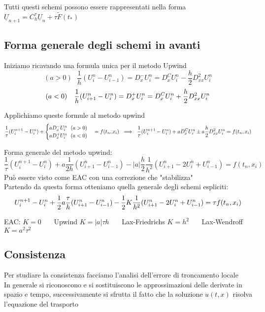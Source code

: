 \documentclass{article}
\renewcommand{\vv}[1]{\underline{#1}}
\begin{document}
\phantom{}

Tutti questi schemi possono essere rappresentati nella forma $\vv{U}_{n+1} = C_h^{\tau}\vv{U}_n + \tau \tilde{F}(t_*)$\\


\subsection{Forma generale degli schemi in avanti}

Iniziamo ricavando una formula unica per il metodo Upwind
\[
(a>0) \ \ \ \frac{1}{h} (U_i^n-U_{i-1}^n) = D^-_x U_i^n = D_x^C U_i^n -\frac{h}{2} D^2_{xx} U_i^n
\]
\[
(a<0) \ \ \ \frac{1}{h} (U_{i+1}^n-U_i^n) = D^+_x U_i^n = D_x^C U_i^n +\frac{h}{2} D^2_{xx} U_i^n\skipp
\]

Applichiamo queste formule al metodo upwind
\[
\frac{1}{\tau}(U_i^{n+1}-U_i^n) + \begin{cases} aD_x^- U_i^n \ \ (a>0)\\
aD_x^+ U_i^n \ \ (a<0)
\end{cases} = f(t_n,x_i) \ \implies \ \frac{1}{\tau}(U_i^{n+1}-U_i^n) + aD_x^C U_i^n \pm a \frac{h}{2} D_{xx}^2 U_i^n = f(t_n,x_i)\skipp
\]

Forma generale del metodo upwind:
\[
\frac{1}{\tau}(U_i^{n+1}-U_i^n) + a\frac{1}{2h} (U_{i+1}^n-U_{i-1}^n) - |a| \frac{h}{2} \frac{1}{h^2} (U_{i+1}^n - 2U_i^n + U_{i-1}^n) = f(t_n,x_i)
\]
Può essere visto come EAC con una correzione che "stabilizza"\\

Partendo da questa forma otteniamo quella generale degli schemi espliciti:
\[
U_i^{n+1} - U_i^n + \frac{1}{2} a \frac{\tau}{h} (U_{i+1}^n-U_{i-1}^n) - \frac12 K \frac{1}{h^2}(U_{i+1}^n - 2U_i^n + U_{i-1}^n) = \tau f(t_n,x_i)\skipp
\]

EAC: $K=0$ \ \ \ Upwind $K=|a|\tau h$ \ \ \ Lax-Friedrichs $K=h^2$ \ \ \ Lax-Wendroff $K=a^2\tau^2$ \\


\subsection{Consistenza}

Per studiare la consistenza facciamo l'analisi dell'errore di troncamento locale\\

In generale si riconoscono e si sostituiscono le approssimazioni delle derivate in spazio e tempo, successivamente si sfrutta il fatto che la soluzione $u(t,x)$ risolva l'equazione del trasporto\\
\end{document}
